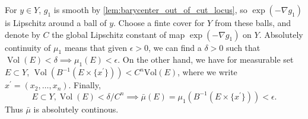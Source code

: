 For $y \in Y$, $g_1$ is smooth by \cref{lem:barycenter_out_of_cut_locus},
so $\exp( - \nabla g_1)$ is Lipschitz around a ball of $y$.
Choose a finte cover for $Y$ from these balls,
and denote by $C$ the global Lipschitz constant of map \(\exp(-\nabla g_1)\) on $Y$.
Absolutely continuity of $\mu_1$ means that given $\epsilon > 0$,
we can find a $\delta >0$ such that $ \operatorname{Vol}(E) < \delta \implies \mu_1(E) < \epsilon$.
On the other hand, we have for measurable set $E \subset Y$,
$\operatorname{Vol}(B^{-1}( E\times \{x^\prime\})) < C^n \text{Vol}(E)$,
where we write $x^\prime = (x_2, \ldots, x_n)$.
Finally,
\begin{equation}
	\label{equa:absolutely_continuity_estimation}
	E \subset Y, \operatorname{Vol}(E) < \delta / C^n \implies \bar{\mu}(E)=\mu_1(B^{-1}(E \times \{x^\prime\})) < \epsilon.
\end{equation}
Thus $\bar{\mu}$ is absolutely continous.
